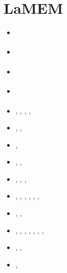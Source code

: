 \section{LaMEM}

\begin{small}
\begin{itemize}
\item[\twothousandeight]       \textcite{scbe08}
\item[\twothousandten]         \textcite{kamm10}
\item[\twothousandeleven]      \textcite{lemk11}
\item[\twothousandtwelve]      \textcite{may12}
\item[\twothousandfourteen]    \textcite{lesh14},  \textcite{cokm14},  \textcite{bakp14}, 
                               \textcite{feka14a}, \textcite{feka14b}
\item[\twothousandfifteen]     \textcite{puka15},  \textcite{feka15},  \textcite{cofk15}
\item[\twothousandsixteen]     \textcite{kapb16},  \textcite{coyc16}
\item[\twothousandeighteen]    \textcite{pukp18},  \textcite{rekp18},  \textcite{repk18}
\item[\twothousandnineteen]    \textcite{eitp19},  \textcite{hooi19}, 
                               \textcite{pust19},  \textcite{wakz19}
\item[\twothousandtwenty]      \textcite{eitf20},  \textcite{spsk20}, \textcite{pikw20},
                               \textcite{pust20},  \textcite{yakl20}, 
                               \textcite{spbe20},  \textcite{rehp20}
\item[\twothousandtwentyone]   \textcite{suky21},  \textcite{yalw21}, \textcite{waky21}
\item[\twothousandtwentytwo]   \textcite{toyp22},  \textcite{alrr22a}, \textcite{mokj22},
                               \textcite{pusk22},  \textcite{spbk22},  \textcite{lisb22},
                               \textcite{hura22},  \textcite{rokp22}
\item[\twothousandtwentythree] \textcite{gacy23},  \textcite{rida23}, \textcite{yazl23}
\item[\twothousandtwentyfour]  \textcite{durr24},  \textcite{tibi24}
\end{itemize}
\end{small}

